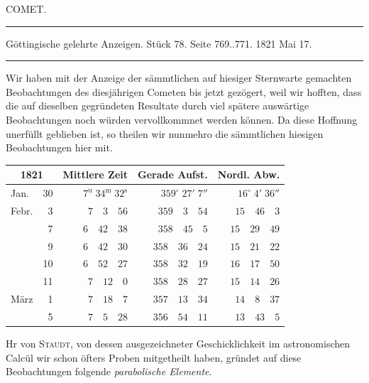 \clearpage
{}
\hypertarget{native-442-part-lower}{}
\begin{center}
{\large COMET.}

\noindent\rule{\linewidth}{0.4pt}

Göttingische gelehrte Anzeigen. Stück 78. Seite 769..771. 1821 Mai 17.

\noindent\rule{\linewidth}{0.4pt}
\end{center}

Wir haben mit der Anzeige der sämmtlichen auf hiesiger Sternwarte gemachten Beobachtungen
des diesjährigen Cometen bis jetzt gezögert, weil wir hofften, dass die auf dieselben gegründeten Resultate durch viel spätere auswärtige Beobachtungen noch würden vervollkommnet werden können.
Da diese Hoffnung unerfüllt geblieben ist, so theilen wir nunmehro die sämmtlichen hiesigen Beobachtungen hier mit.

\begin{center}
\begin{tabular}{lr|r|r|r}
\multicolumn{2}{c|}{1821} & Mittlere Zeit & Gerade Aufst. & Nordl. Abw. \\
\hline
Jan. & 30 & $7^{\mathrm{u}}\;34^{\mathrm{m}}\;32^{\mathrm{s}}$ & $359^\circ\;27'\;7''$ & $16^\circ\;4'\;36''$ \\
Febr. & 3 & $7\quad3\quad56$ & $359\quad3\quad54$ & $15\quad46\quad3$ \\
& 7 & $6\quad42\quad38$ & $358\quad45\quad5$ & $15\quad29\quad49$ \\
& 9 & $6\quad42\quad30$ & $358\quad36\quad24$ & $15\quad21\quad22$ \\
& 10 & $6\quad52\quad27$ & $358\quad32\quad19$ & $16\quad17\quad50$ \\
& 11 & $7\quad12\quad0$ & $358\quad28\quad27$ & $15\quad14\quad26$ \\
März & 1 & $7\quad18\quad7$ & $357\quad13\quad34$ & $14\quad8\quad37$ \\
& 5 & $7\quad5\quad28$ & $356\quad54\quad11$ & $13\quad43\quad5$ \\
\end{tabular}
\end{center}

Hr von \textsc{Staudt}, von dessen ausgezeichneter Geschicklichkeit im astronomischen Calcül wir schon öfters Proben mitgetheilt haben, gründet auf diese Beobachtungen folgende \emph{parabolische Elemente}.

